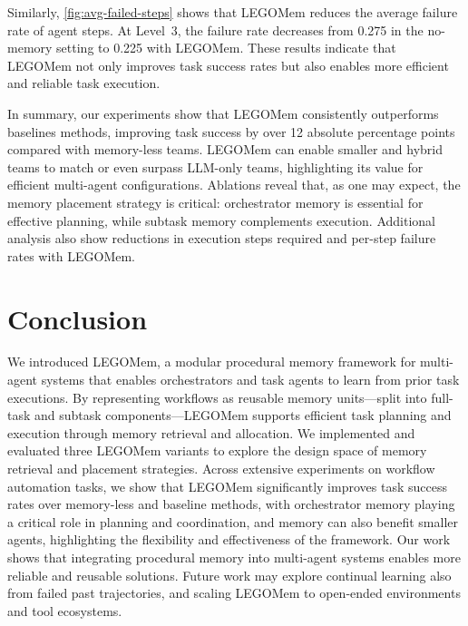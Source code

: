 \documentclass[sigconf]{aamas}
\newcommand{\legomem}{LEGOMem}
\begin{document}
Similarly, \autoref{fig:avg-failed-steps} shows that \legomem{} reduces the average failure rate of agent steps. At Level~3, the failure rate decreases from 0.275 in the no-memory setting to 0.225 with \legomem{}. These results indicate that \legomem{} not only improves task success rates but also enables more efficient and reliable task execution.

In summary, our experiments show that \legomem{} consistently outperforms baselines methods, improving task success by over 12 absolute percentage points compared with memory-less teams. \legomem{} can enable smaller and hybrid teams to match or even surpass LLM-only teams, highlighting its value for efficient multi-agent configurations. Ablations reveal that, as one may expect, the memory placement strategy is critical: orchestrator memory is essential for effective planning, while subtask memory complements execution. Additional analysis also show reductions in execution steps required and per-step failure rates with \legomem{}. 

\section{Conclusion}

We introduced \legomem{}, a modular procedural memory framework for multi-agent systems that enables orchestrators and task agents to learn from prior task executions. By representing workflows as reusable memory units—split into full-task and subtask components—\legomem{} supports efficient task planning and execution through memory retrieval and allocation.
We implemented and evaluated three \legomem{} variants to explore the design space of memory retrieval and placement strategies. Across extensive experiments on workflow automation tasks, we show that \legomem{} significantly improves task success rates over memory-less and baseline methods, with orchestrator memory playing a critical role in planning and coordination, and memory can also benefit smaller agents, highlighting the flexibility and effectiveness of the framework.
Our work shows that integrating procedural memory into multi-agent systems enables more reliable and reusable solutions. Future work may explore continual learning also from failed past trajectories, and scaling \legomem{} to open-ended environments and tool ecosystems.



\end{document}
